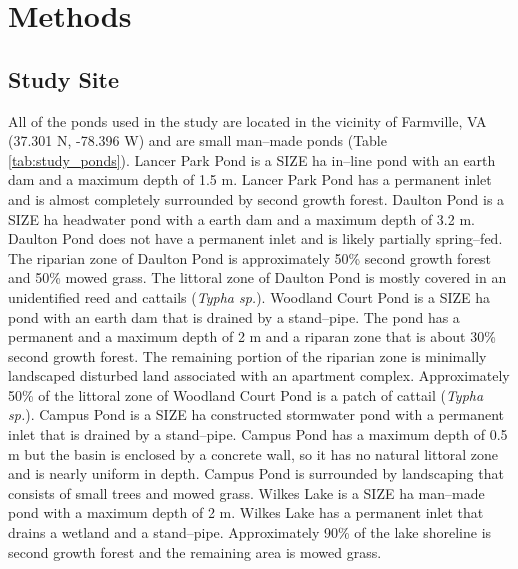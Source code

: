 \section{Methods}
\subsection{Study Site}
All of the ponds used in the study are located in the vicinity of Farmville, VA (37.301 N, -78.396 W) and are small man--made ponds (Table \ref{tab:study_ponds}). Lancer Park Pond is a SIZE ha in--line pond with an earth dam and a maximum depth of 1.5 m. Lancer Park Pond has a permanent inlet and is almost completely surrounded by second growth forest. Daulton Pond is a SIZE ha headwater pond with a earth dam and a maximum depth of 3.2 m. Daulton Pond does not have a permanent inlet and is likely partially spring--fed. The riparian zone of Daulton Pond is approximately 50\% second growth forest and 50\% mowed grass. The littoral zone of Daulton Pond is mostly covered in an unidentified reed and cattails (\emph{Typha sp.}). Woodland Court Pond is a SIZE ha pond with an earth dam that is drained by a stand--pipe. The pond has a permanent and a maximum depth of 2 m and a riparan zone that is about 30\% second growth forest. The remaining portion of the riparian zone is minimally landscaped disturbed land associated with an apartment complex. Approximately 50\% of the littoral zone of Woodland Court Pond is a patch of cattail (\emph{Typha sp.}). Campus Pond is a SIZE ha constructed stormwater pond with a permanent inlet that is drained by a stand--pipe. Campus Pond has a maximum depth of 0.5 m but the basin is enclosed by a concrete wall, so it has no natural littoral zone and is nearly uniform in depth. Campus Pond is surrounded by landscaping that consists of small trees and mowed grass. Wilkes Lake is a SIZE ha man--made pond with a maximum depth of 2 m. Wilkes Lake has a permanent inlet that drains a wetland and a stand--pipe. Approximately 90\% of the lake shoreline is second growth forest and the remaining area is mowed grass.


    
